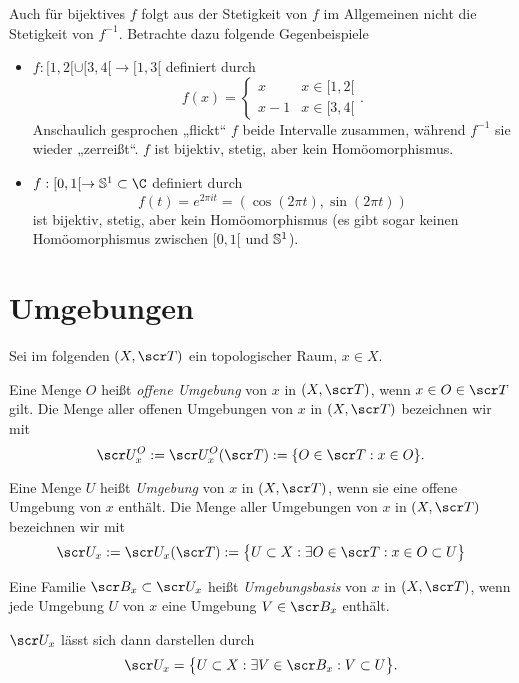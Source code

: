\begin{nt}
	Auch für bijektives $f$ folgt aus der Stetigkeit von $f$ im Allgemeinen nicht die Stetigkeit von $f^{-1}$.
	Betrachte dazu folgende Gegenbeispiele
	\begin{itemize}
		\item
			$f: [1,2[ \cup [3,4[ \to [1,3[$ definiert durch
			\[
				f(x) = \begin{cases}
					x & x \in [1,2[ \\
					x - 1 & x \in [3,4[
				\end{cases}.
			\]
			Anschaulich gesprochen „flickt“ $f$ beide Intervalle zusammen, während $f^{-1}$ sie wieder „zerreißt“.
			$f$ ist bijektiv, stetig, aber kein Homöomorphismus.
		\item
			$f : [0,1[ \to \S^1 \subset \C$ definiert durch
			\[
				f(t)
				= e^{2\pi i t}
				= (\cos (2\pi t), \sin (2\pi t))
			\]
			ist bijektiv, stetig, aber kein Homöomorphismus (es gibt sogar keinen Homöomorphismus zwischen $[0,1[$ und $\S^1$).
	\end{itemize}
\end{nt}


\section{Umgebungen}


Sei im folgenden $(X, \scr T)$ ein topologischer Raum, $x \in X$.

\begin{df}
	Eine Menge $O$ heißt \emph{offene Umgebung} von $x$ in $(X,\scr T)$, wenn $x \in O \in \scr T$ gilt.
	Die Menge aller offenen Umgebungen von $x$ in $(X, \scr T)$ bezeichnen wir mit
	\[
		\scr U_x^O := \scr U_x^O(\scr T)
		:= \{ O \in \scr T : x \in O \}.
	\]

	Eine Menge $U$ heißt \emph{Umgebung} von $x$ in $(X, \scr T)$, wenn sie eine offene Umgebung von $x$ enthält.
	Die Menge aller Umgebungen von $x$ in $(X, \scr T)$ bezeichnen wir mit
	\[
		\scr U_x := \scr U_x(\scr T)
		:= \big\{ U \subset X : \exists O \in \scr T : x \in O \subset U \big\}
	\]
\end{df}

\begin{df}
	Eine Familie $\scr B_x \subset \scr U_x$ heißt \emph{Umgebungsbasis} von $x$ in $(X, \scr T)$, wenn jede Umgebung $U$ von $x$ eine Umgebung $V \in \scr B_x$ enthält.

	$\scr U_x$ lässt sich dann darstellen durch
	\[
		\scr U_x = \big\{ U \subset X : \exists V \in \scr B_x : V \subset U \big\}.
	\]
\end{df}


